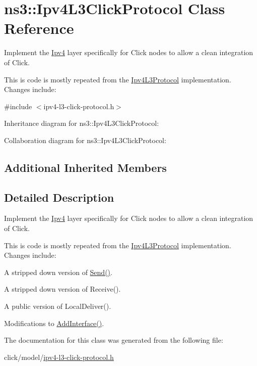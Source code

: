 \hypertarget{classns3_1_1Ipv4L3ClickProtocol}{}\section{ns3\+:\+:Ipv4\+L3\+Click\+Protocol Class Reference}
\label{classns3_1_1Ipv4L3ClickProtocol}


Implement the \hyperlink{classns3_1_1Ipv4}{Ipv4} layer specifically for Click nodes to allow a clean integration of Click.

This is code is mostly repeated from the \hyperlink{classns3_1_1Ipv4L3Protocol}{Ipv4\+L3\+Protocol} implementation. Changes include\+:  




{\ttfamily \#include $<$ipv4-\/l3-\/click-\/protocol.\+h$>$}



Inheritance diagram for ns3\+:\+:Ipv4\+L3\+Click\+Protocol\+:


Collaboration diagram for ns3\+:\+:Ipv4\+L3\+Click\+Protocol\+:
\subsection*{Additional Inherited Members}


\subsection{Detailed Description}
Implement the \hyperlink{classns3_1_1Ipv4}{Ipv4} layer specifically for Click nodes to allow a clean integration of Click.

This is code is mostly repeated from the \hyperlink{classns3_1_1Ipv4L3Protocol}{Ipv4\+L3\+Protocol} implementation. Changes include\+: 


\begin{DoxyItemize}
\item A stripped down version of \hyperlink{classns3_1_1Ipv4_a81f6cbb774cdc255e3e49490e0960539}{Send()}.
\item A stripped down version of Receive().
\item A public version of Local\+Deliver().
\item Modifications to \hyperlink{classns3_1_1Ipv4_a637354128b71bc587ea5a6eeaef42469}{Add\+Interface()}. 
\end{DoxyItemize}

The documentation for this class was generated from the following file\+:\begin{DoxyCompactItemize}
\item 
click/model/\hyperlink{ipv4-l3-click-protocol_8h}{ipv4-\/l3-\/click-\/protocol.\+h}\end{DoxyCompactItemize}
